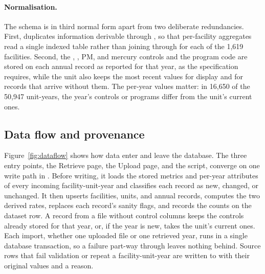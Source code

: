 \documentclass[11pt,a4paper]{article}
\begin{document}
\paragraph{Normalisation.} The schema is in third normal form apart from two deliberate
redundancies. First,  duplicates information derivable through
, so that per-facility aggregates read a single indexed table rather than joining
through  for each of the 1,619 facilities. Second, the \SOtwo, \NOx, PM, and mercury
controls and the program code are stored on each annual record as reported for that year, as
the specification requires, while the unit also keeps the most recent values for display and
for records that arrive without them. The per-year values matter: in 16{,}650 of the 50{,}947 unit-years, the year's controls or programs differ from
the unit's current ones.

\subsection{Data flow and provenance}

Figure~\ref{fig:dataflow} shows how data enter and leave the database. The three entry
points, the Retrieve page, the Upload page, and the  script, converge on
one write path in . Before writing, it loads the stored metrics and
per-year attributes of every incoming facility-unit-year and classifies each record as new,
changed, or unchanged. It then upserts facilities, units, and annual records, computes the two
derived rates, replaces each record's sanity flags, and records the counts on the dataset row.
A record from a file without control columns keeps the controls already stored for that year,
or, if the year is new, takes the unit's current ones. Each import,
whether one uploaded file or one retrieved year, runs in a single database transaction, so a
failure part-way through leaves nothing behind. Source rows that fail
validation or repeat a facility-unit-year are written to  with their
original values and a reason.
\end{document}
